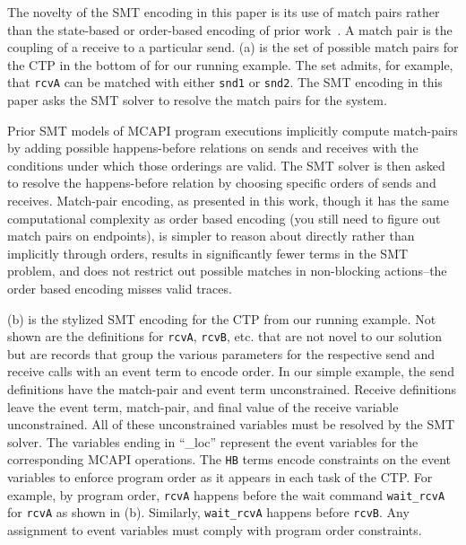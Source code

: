 The novelty of the SMT encoding in this paper is its use of match
pairs rather than the state-based or order-based encoding of prior work~\cite{elwakil:padtad10,elwakil:atva10}. A match pair is the coupling of a receive to a particular send.
(a) is the set of possible match pairs for the CTP in
the bottom of  for our running example. The set
admits, for example, that \texttt{rcvA} can be matched with either
\texttt{snd1} or \texttt{snd2}. The SMT encoding in this paper asks
the SMT solver to resolve the match pairs for the system.

Prior SMT models of MCAPI program executions implicitly compute
match-pairs by adding possible happens-before relations on sends and
receives with the conditions under which those orderings are
valid. The SMT solver is then asked to resolve the happens-before
relation by choosing specific orders of sends and receives. Match-pair
encoding, as presented in this work, though it has the same
computational complexity as order based encoding (you still need to
figure out match pairs on endpoints), is simpler to reason about
directly rather than implicitly through orders, results in
significantly fewer terms in the SMT problem, and does not restrict
out possible matches in non-blocking actions--the order based encoding
misses valid traces.

(b) is the stylized SMT encoding for the CTP from our running
example. Not shown are the definitions for \texttt{rcvA}, \texttt{rcvB}, etc.
that are not novel to our solution but are records that group the various
parameters for the respective send and receive calls with an event term to
encode order. In our simple example, the send definitions have the match-pair and event
term unconstrained. Receive definitions leave the event term, match-pair, and final
value of the receive variable unconstrained. All of these unconstrained variables must
be resolved by the SMT solver. The variables ending in ``\_loc'' represent the
event variables for the corresponding MCAPI operations. The \texttt{HB} terms
encode constraints on the event variables to enforce program order as it
appears in each task of the CTP. For example, by program order, \texttt{rcvA}
happens before the wait command \texttt{wait\_rcvA} for \texttt{rcvA} as shown in (b). Similarly,
\texttt{wait\_rcvA} happens before \texttt{rcvB}. Any assignment to event
variables must comply with program order constraints.

